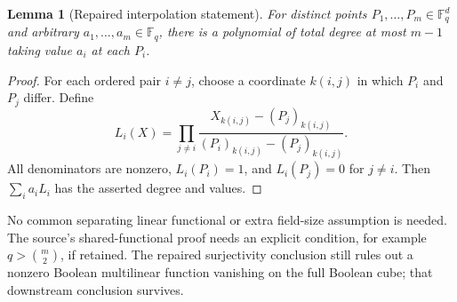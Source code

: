 \documentclass[11pt]{article}
\newtheorem{lemma}{Lemma}
\begin{document}
\begin{lemma}[Repaired interpolation statement]
For distinct points $P_1,\ldots,P_m\in\mathbb F_q^d$ and arbitrary
$a_1,\ldots,a_m\in\mathbb F_q$, there is a polynomial of total degree
at most $m-1$ taking value $a_i$ at each $P_i$.
\end{lemma}
\begin{proof}
For each ordered pair $i\ne j$, choose a coordinate $k(i,j)$ in which
$P_i$ and $P_j$ differ. Define
\[
 L_i(X)=\prod_{j\ne i}
 \frac{X_{k(i,j)}-(P_j)_{k(i,j)}}
 {(P_i)_{k(i,j)}-(P_j)_{k(i,j)}}.
\]
All denominators are nonzero, $L_i(P_i)=1$, and $L_i(P_j)=0$ for $j\ne i$.
Then $\sum_i a_iL_i$ has the asserted degree and values.
\end{proof}
No common separating linear functional or extra field-size assumption is
needed. The source's shared-functional proof needs an explicit condition,
for example $q>\binom m2$, if retained. The repaired surjectivity conclusion
still rules out a nonzero Boolean multilinear function vanishing on the
full Boolean cube; that downstream conclusion survives.
\end{document}
